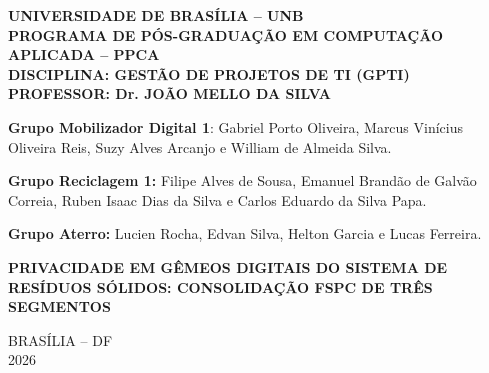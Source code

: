 \documentclass[12pt,a4paper,article,oneside,english,brazil]{abntex2}
\begin{document}
\thispagestyle{empty}
\noindent\begin{minipage}[t][0.92\textheight]{\textwidth}
\centering
\SingleSpacing
\textbf{UNIVERSIDADE DE BRASÍLIA -- UNB\\
PROGRAMA DE PÓS-GRADUAÇÃO EM COMPUTAÇÃO APLICADA -- PPCA\\
DISCIPLINA: GESTÃO DE PROJETOS DE TI (GPTI)\\
PROFESSOR: Dr. JOÃO MELLO DA SILVA}

\vspace{1cm}

\textbf{Grupo Mobilizador Digital 1}: Gabriel Porto Oliveira, Marcus Vinícius Oliveira Reis, Suzy Alves Arcanjo e William de Almeida Silva.

\vspace{0.4cm}

\textbf{Grupo Reciclagem 1:} Filipe Alves de Sousa, Emanuel Brandão de Galvão Correia, Ruben Isaac Dias da Silva e Carlos Eduardo da Silva Papa.

\vspace{0.4cm}

\textbf{Grupo Aterro:} Lucien Rocha, Edvan Silva, Helton Garcia e Lucas Ferreira.

\vspace{3cm}

\textbf{PRIVACIDADE EM GÊMEOS DIGITAIS DO SISTEMA DE RESÍDUOS SÓLIDOS: CONSOLIDAÇÃO FSPC DE TRÊS SEGMENTOS}

\vfill

BRASÍLIA -- DF\\
2026
\end{minipage}
\clearpage
\end{document}
